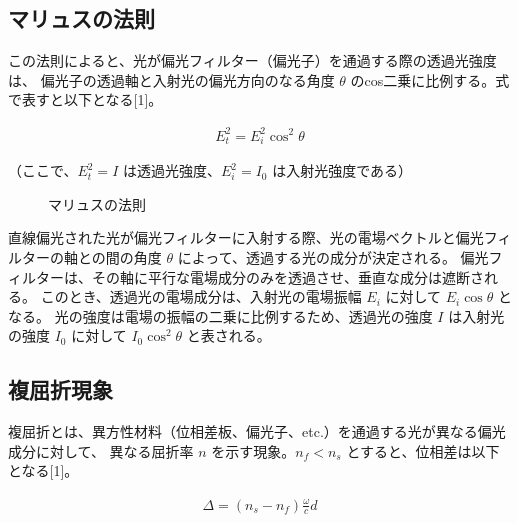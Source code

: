 \documentclass{article}
\begin{document}
\subsection{マリュスの法則}
\begin{spacing}{1.2} %
    この法則によると、光が偏光フィルター（偏光子）を通過する際の透過光強度は、
    偏光子の透過軸と入射光の偏光方向のなる角度 $\theta$ のcos二乗に比例する。式で表すと以下となる[1]。
\end{spacing}
\begin{align}
    E_t^2=E_i^2 \cos ^2 \theta
\end{align}
\begin{center}
    （ここで、$E_t^2 = I$ は透過光強度、$E_i^2 = I_0$ は入射光強度である）
\end{center}
\begin{figure}[!htb] %
    \centering
    \caption{マリュスの法則}
    \label{fig:1}
\end{figure}
\FloatBarrier
\begin{spacing}{1.2} %
    直線偏光された光が偏光フィルターに入射する際、光の電場ベクトルと偏光フィルターの軸との間の角度 $\theta$ によって、透過する光の成分が決定される。
    偏光フィルターは、その軸に平行な電場成分のみを透過させ、垂直な成分は遮断される。
    このとき、透過光の電場成分は、入射光の電場振幅 $E_i$ に対して $E_i\cos \theta$ となる。
    光の強度は電場の振幅の二乗に比例するため、透過光の強度 $I$ は入射光の強度 $I_0$ に対して $I_0 \cos ^2 \theta$ と表される。
\end{spacing}

\subsection{複屈折現象}
\begin{spacing}{1.2} %
    複屈折とは、異方性材料（位相差板、偏光子、etc.）を通過する光が異なる偏光成分に対して、
    異なる屈折率 $n$ を示す現象。$n_f<n_s$ とすると、位相差は以下となる[1]。
\end{spacing}
\begin{align}
    \Delta=\left(n_s-n_f\right) \frac{\omega}{c} d
\end{align}
\end{document}
